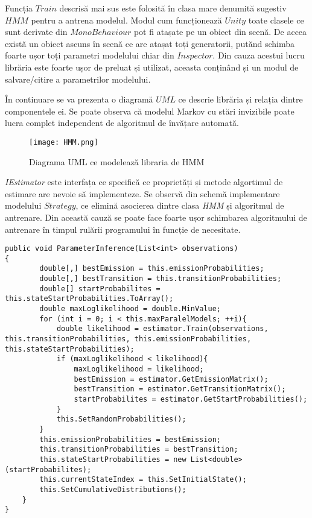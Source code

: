 Funcția $Train$ descrisă mai sus este folosită în clasa mare denumită sugestiv $HMM$ pentru a antrena modelul. Modul cum funcționează $Unity$ toate clasele ce sunt derivate din $MonoBehaviour$ pot fi atașate pe un obiect din scenă. De accea există un obiect ascuns în scenă ce are atașat toți generatorii, putănd schimba foarte ușor toți parametri modelului chiar din $Inspector$. Din cauza acestui lucru librăria este foarte ușor de preluat și utilizat, aceasta conținând și un modul de salvare/citire a parametrilor modelului.\par

În continuare se va prezenta o diagramă $UML$ ce descrie librăria și relația dintre componentele ei. Se poate observa că modelul Markov cu stări invizibile poate lucra complet independent de algoritmul de învățare automată.\par

\vspace{10mm}
\begin{figure}[H]
\centering
\texttt{[image: HMM.png]} \par
\caption{Diagrama UML ce modelează libraria de HMM}
\end{figure}

\textit{IEstimator} este interfața ce specifică ce proprietăți și metode algortimul de estimare are nevoie să implementeze. Se observă din schemă implementare modelului $Strategy$, ce elimină asocierea dintre clasa \textit{HMM} și algoritmul de antrenare. Din această cauză se poate face foarte ușor schimbarea algoritmului de antrenare în timpul rulării programului în funcție de necesitate.\par

\begin{lstlisting}[caption=Folosirea funcție $Train$ în cadrul modelului]
public void ParameterInference(List<int> observations)
{
        double[,] bestEmission = this.emissionProbabilities;
        double[,] bestTransition = this.transitionProbabilities;
        double[] startProbabilites = this.stateStartProbabilities.ToArray();
        double maxLoglikelihood = double.MinValue;
        for (int i = 0; i < this.maxParalelModels; ++i){
            double likelihood = estimator.Train(observations, this.transitionProbabilities, this.emissionProbabilities, this.stateStartProbabilities);
            if (maxLoglikelihood < likelihood){
                maxLoglikelihood = likelihood;
                bestEmission = estimator.GetEmissionMatrix();
                bestTransition = estimator.GetTransitionMatrix();
                startProbabilites = estimator.GetStartProbabilities();
            }
            this.SetRandomProbabilities();
        }
        this.emissionProbabilities = bestEmission;
        this.transitionProbabilities = bestTransition;
        this.stateStartProbabilities = new List<double>(startProbabilites);
        this.currentStateIndex = this.SetInitialState();
        this.SetCumulativeDistributions();
    }
}
\end{lstlisting}


